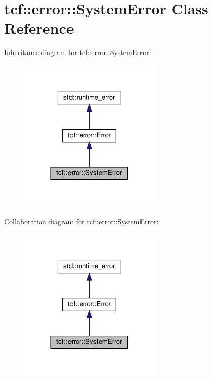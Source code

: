 \hypertarget{classtcf_1_1error_1_1SystemError}{}\section{tcf\+:\+:error\+:\+:System\+Error Class Reference}
\label{classtcf_1_1error_1_1SystemError}


Inheritance diagram for tcf\+:\+:error\+:\+:System\+Error\+:
\nopagebreak
\begin{figure}[H]
\begin{center}
\leavevmode
\includegraphics[width=194pt]{classtcf_1_1error_1_1SystemError__inherit__graph}
\end{center}
\end{figure}


Collaboration diagram for tcf\+:\+:error\+:\+:System\+Error\+:
\nopagebreak
\begin{figure}[H]
\begin{center}
\leavevmode
\includegraphics[width=194pt]{classtcf_1_1error_1_1SystemError__coll__graph}
\end{center}
\end{figure}
